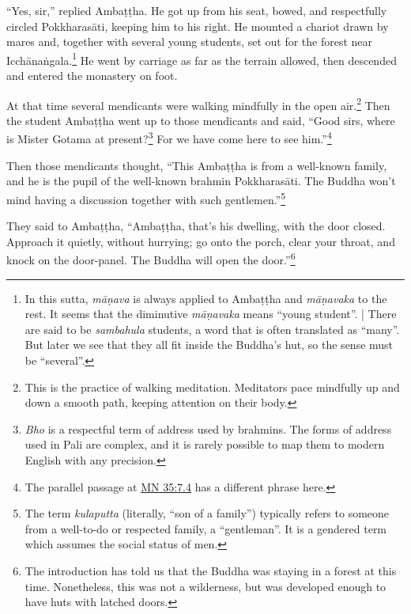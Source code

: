 \documentclass[12pt,openany]{book}%
\begin{document}
“Yes, sir,” replied \textsanskrit{Ambaṭṭha}. He got up from his seat, bowed, and respectfully circled \textsanskrit{Pokkharasāti}, keeping him to his right. He mounted a chariot drawn by mares and, together with several young students, set out for the forest near \textsanskrit{Icchānaṅgala}.\footnote{In this sutta, \textit{\textsanskrit{māṇava}} is always applied to \textsanskrit{Ambaṭṭha} and \textit{\textsanskrit{māṇavaka}} to the rest. It seems that the diminutive \textit{\textsanskrit{māṇavaka}} means “young student”. | There are said to be \textit{sambahula} students, a word that is often translated as “many”. But later we see that they all fit inside the Buddha’s hut, so the sense must be “several”. } He went by carriage as far as the terrain allowed, then descended and entered the monastery on foot. 

At that time several mendicants were walking mindfully in the open air.\footnote{This is the practice of walking meditation. Meditators pace mindfully up and down a smooth path, keeping attention on their body. } Then the student \textsanskrit{Ambaṭṭha} went up to those mendicants and said, “Good sirs, where is Mister Gotama at present?\footnote{\textit{Bho} is a respectful term of address used by brahmins. The forms of address used in Pali are complex, and it is rarely possible to map them to modern English with any precision. } For we have come here to see him.”\footnote{The parallel passage at \href{https://suttacentral.net/mn35/en/sujato\#7.4}{MN 35:7.4} has a different phrase here. } 

Then those mendicants thought, “This \textsanskrit{Ambaṭṭha} is from a well-known family, and he is the pupil of the well-known brahmin \textsanskrit{Pokkharasāti}. The Buddha won’t mind having a discussion together with such gentlemen.”\footnote{The term \textit{kulaputta} (literally, “son of a family”) typically refers to someone from a well-to-do or respected family, a “gentleman”. It is a gendered term which assumes the social status of men. } 

They said to \textsanskrit{Ambaṭṭha}, “\textsanskrit{Ambaṭṭha}, that’s his dwelling, with the door closed. Approach it quietly, without hurrying; go onto the porch, clear your throat, and knock on the door-panel. The Buddha will open the door.”\footnote{The introduction has told us that the Buddha was staying in a forest at this time. Nonetheless, this was not a wilderness, but was developed enough to have huts with latched doors. } 
\end{document}
